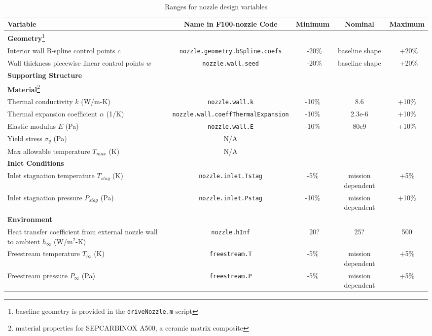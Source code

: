 \documentclass{article}
\begin{document}
\begin{landscape}

\begin{table}
\caption{Ranges for nozzle design variables}
\label{tab:variableRanges}
\begin{center}
\begin{tabular}[]{p{4cm} | c | c | c | c}
Variable & Name in F100-nozzle Code & Minimum & Nominal & Maximum \\
\hline
\textbf{Geometry}\footnote{baseline geometry is provided in the \texttt{driveNozzle.m} script} & & & & \\ \hline
Interior wall B-spline control points $c$ & \texttt{nozzle.geometry.bSpline.coefs} & ~-20\% & baseline shape & ~+20\% \\ \hline
Wall thickness piecewise linear control points $w$ & \texttt{nozzle.wall.seed} & ~-20\% & baseline shape & ~+20\% \\ \hline
\hline
\textbf{Supporting Structure} & & & & \\ \hline
\hline
\textbf{Material}\footnote{material properties for SEPCARBINOX A500, a ceramic matrix composite} & & & & \\ \hline
Thermal conductivity $k$ (W/m-K) & \texttt{nozzle.wall.k} & -10\% & 8.6 & +10\% \\ \hline
Thermal expansion coefficient $\alpha$ (1/K) & \texttt{nozzle.wall.coeffThermalExpansion} & -10\% & 2.3e-6 & +10\% \\ \hline
Elastic modulus $E$ (Pa) & \texttt{nozzle.wall.E} & -10\% & 80e9 & +10\% \\ \hline
Yield stress $\sigma_y$ (Pa) & N/A & & & \\ \hline
Max allowable temperature $T_{max}$ (K) & N/A & & & \\ \hline
\hline
\textbf{Inlet Conditions} & & & & \\ \hline
Inlet stagnation temperature $T_{stag}$ (K) & \texttt{nozzle.inlet.Tstag} & -5\% & mission dependent & +5\% \\ \hline
Inlet stagnation pressure $P_{stag}$ (Pa) & \texttt{nozzle.inlet.Pstag} & -10\% & mission dependent & +10\% \\ \hline
\hline
\textbf{Environment} & & & & \\ \hline
Heat transfer coefficient from external nozzle wall to ambient $h_{\infty}$ (W/$\textrm{m}^2$-K) & \texttt{nozzle.hInf} & ~20? & 25? & 500 \\ \hline
Freestream temperature $T_{\infty}$ (K) & \texttt{freestream.T} & -5\% & mission dependent & +5\% \\ \hline
Freestream pressure $P_{\infty}$ (Pa) & \texttt{freestream.P} & -5\% & mission dependent & +5\% \\ \hline
\hline
\end{tabular}
\end{center}
\end{table}

\end{landscape}
\end{document}
